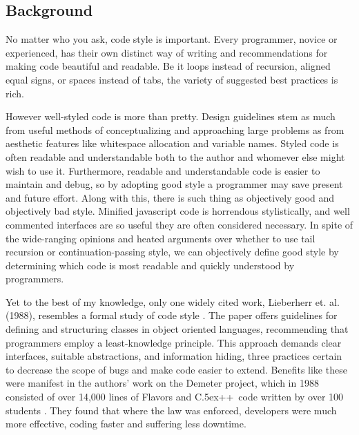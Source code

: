 \documentclass{article}
\begin{document}

\def\cpp{{\rm C\raise.5ex\hbox{\small ++}}}

\subsection*{Background}

No matter who you ask, code style is important.
Every programmer, novice or experienced, has their own distinct way of writing and recommendations for making code beautiful and readable.
Be it loops instead of recursion, aligned equal signs, or spaces instead of tabs, the variety of suggested best practices is rich.

However well-styled code is more than pretty. 
Design guidelines stem as much from useful methods of conceptualizing and approaching large problems as from aesthetic features like whitespace allocation and variable names.
Styled code is often readable and understandable both to the author and whomever else might wish to use it.
Furthermore, readable and understandable code is easier to maintain and debug, so by adopting good style a programmer may save present and future effort.
Along with this, there is such thing as objectively good and objectively bad style.
Minified javascript code is horrendous stylistically, and well commented interfaces are so useful they are often considered necessary.
In spite of the wide-ranging opinions and heated arguments over whether to use tail recursion or continuation-passing style, we can objectively define good style by determining which code is most readable and quickly understood by programmers.

Yet to the best of my knowledge, only one widely cited work, Lieberherr et. al. (1988), resembles a formal study of code style \cite{lieberherr1988object}. 
The paper offers guidelines for defining and structuring classes in object oriented languages, recommending that programmers employ a least-knowledge principle.
This approach demands clear interfaces, suitable abstractions, and information hiding, three practices certain to decrease the scope of bugs and make code easier to extend.
Benefits like these were manifest in the authors' work on the Demeter project, which in 1988 consisted of over 14,000 lines of Flavors and \cpp\ code written by over 100 students \cite[333]{lieberherr1988object}.
They found that where the law was enforced, developers were much more effective, coding faster and suffering less downtime.
\end{document}
